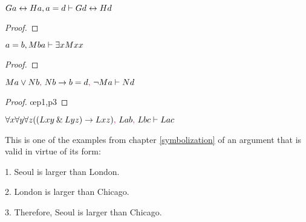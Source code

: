\begin{earg}
\item $Ga \leftrightarrow Ha, a=d \vdash Gd \leftrightarrow Hd$

\begin{proof}
	 \pr{}
	 \pr{}
	 
\end{proof}
\bigskip

\noindent\begin{minipage}{0.99\textwidth}
\item $a=b, Mba \vdash \exists xMxx$

\begin{proof}
	 \pr{}
	 \pr{}
	 
	 
\end{proof}
\smallskip
\end{minipage}

\noindent\begin{minipage}{0.99\textwidth}
\item $Ma \vee Nb\textcolor{magenta}{,}~ Nb \rightarrow b=d\textcolor{magenta}{,}~ {\neg} Ma  \vdash Nd$

\begin{proof}
	 \pr{}
	 \pr{}
	 \pr{}
	 \oe{p1,p3}
	 
	 
\end{proof}
\bigskip
\end{minipage}

\medskip   %

\item $\forall x \forall y \forall z((Lxy \mathbin{\&} Lyz) \rightarrow Lxz)\textcolor{magenta}{,}~ Lab\textcolor{magenta}{,}~ Lbc \vdash Lac$
\end{earg}  %

\noindent\begin{minipage}{0.99\textwidth}
This is one of the examples from chapter \ref{symbolization} of an argument that is valid in virtue of its form:
	\begin{earg}
		\item[1.] Seoul is larger than London.
		\item[2.] London is larger than Chicago.
		\item[3.] Therefore, Seoul is larger than Chicago. 
	\end{earg}
\end{minipage}\bigskip

